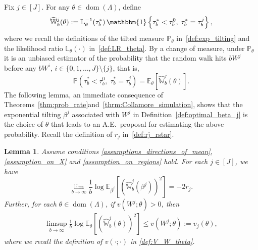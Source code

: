 \documentclass[aap,preprint]{imsart}
\newcommand{\Pro}{{\mathbb{P}}}
\newcommand{\Exp}{{\mathbb{E}}}
\newcommand{\bR}{{\mathbb{R}}}
\theoremstyle{plain}
\newtheorem{lemma}[theorem]{Lemma}
\theoremstyle{definition}
\begin{document}
Fix $j \in [J]$.   For any $\theta \in \operatorname{dom}(\Lambda)$, define
\begin{align*}
\widehat{\mathbb{W}}_{b}^{j}(\theta) :=  
\mathbb{L}_{\theta}^{-1}(\tau_b^*)  \, \mathbbm{1}\left\{
\tau_b^* < \tau_b^0,\; \tau_b^* = \tau_b^j \right\} ,
\end{align*}
where we recall the definitions of the tilted measure $\Pro_{\theta}$ in~\eqref{def:exp_tilting} and the likelihood ratio $\mathbb{L}_{\theta}(\cdot)$ in~\eqref{def:LR_theta}. By a change of measure, under $\Pro_\theta$ it is an unbiased estimator of the probability that the random walk hits $bW^{j}$ before any $bW^i$, $i \in \{0,1,\ldots,J\} \setminus \{j\}$, that is,
$$
\Pro\left(\tau_b^* < \tau_b^0,\; \tau_b^* = \tau_b^j\right)= \Exp_{\theta} \left[   \widehat{\mathbb{W}}_{b}^{j}(\theta) \right].
$$
 The following lemma, an immediate consequence of Theorems~\ref{thm:prob_rate}and~\ref{thrm:Collamore_simulation}, shows that 
 the exponential tilting $\beta^j$ associated with $W^j$ in Definition~\ref{def:optimal_beta_j} is the choice of $\theta$ that leads to an  A.E.~proposal for estimating the above probability. Recall the definition of   $r_j$ in~\eqref{def:rj_rstar}. 

 



\begin{lemma}\label{lemma:upper_bound_var_single_j}
 Assume conditions \eqref{assumptions_directions_of_mean},  \eqref{assumption_on_X} and \eqref{assumption_on_regions} hold. For each $j \in [J]$, we have
$$
\lim_{b \to \infty} \frac{1}{b} \log \Exp_{\beta^{j}}\left[ 
\left(\widehat{\mathbb{W}}_{b}^{j}(\beta^j)\right)^2
\right]
 = -2r_j.
$$
Further,  for each  $\theta \in \operatorname{dom}(\Lambda)$, if $v(W^j;\theta) > 0$, then
\begin{align}\label{def:vj_def}
\limsup_{b \to \infty} \frac{1}{b} \log \Exp_{\theta}\left[ 
\left(\widehat{\mathbb{W}}_{b}^{j}(\theta)\right)^2
\right]
\leq 
v(W^j;\theta) := v_j(\theta),
\end{align}
where we recall the definition of $v(\cdot;\cdot)$ in \eqref{def:V_W_theta}.
\end{lemma}
\end{document}
